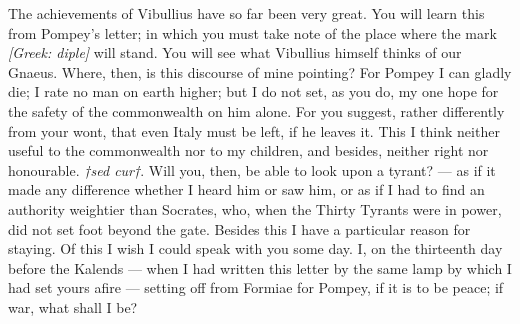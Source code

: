  The achievements of Vibullius have so far been very great. You will learn this from Pompey's letter; in which you must take note of the place where the mark \textit{[Greek: diple]} will stand. You will see what Vibullius himself thinks of our Gnaeus. Where, then, is this discourse of mine pointing? For Pompey I can gladly die; I rate no man on earth higher; but I do not set, as you do, my one hope for the safety of the commonwealth on him alone. For you suggest, rather differently from your wont, that even Italy must be left, if he leaves it. This I think neither useful to the commonwealth nor to my children, and besides, neither right nor honourable. \textit{†sed cur†}. Will you, then, be able to look upon a tyrant? --- as if it made any difference whether I heard him or saw him, or as if I had to find an authority weightier than Socrates, who, when the Thirty Tyrants were in power, did not set foot beyond the gate. Besides this I have a particular reason for staying. Of this I wish I could speak with you some day. I, on the thirteenth day before the Kalends --- when I had written this letter by the same lamp by which I had set yours afire --- setting off from Formiae for Pompey, if it is to be peace; if war, what shall I be?
